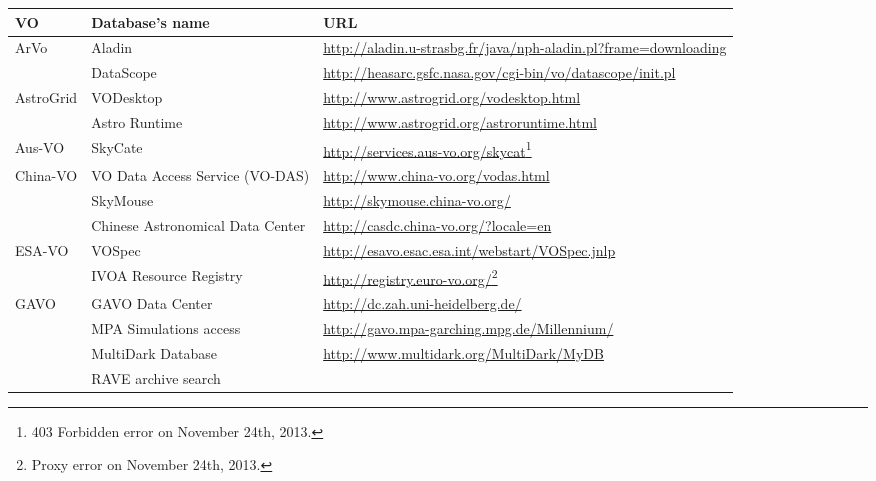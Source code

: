 \onecolumn
\begin{longtable}{|m{2cm}|m{4.5cm}|m{7.5cm}|}
    \hline
    \textbf{VO} & \textbf{Database's name} & \textbf{URL} \\
    \hline
    \multirow{2}{*}{ArVo} & Aladin
    & \url{http://aladin.u-strasbg.fr/java/nph-aladin.pl?frame=downloading} \\
    \cline{2-3}
     & DataScope
     & \url{http://heasarc.gsfc.nasa.gov/cgi-bin/vo/datascope/init.pl} \\
     \hline
    \multirow{2}{*}{AstroGrid} & VODesktop
    & \url{http://www.astrogrid.org/vodesktop.html}\\
    \cline{2-3}
     & Astro Runtime & \url{http://www.astrogrid.org/astroruntime.html} \\
     \hline
    Aus-VO & SkyCate
    & \url{http://services.aus-vo.org/skycat}\footnote{403 Forbidden error on 
                                                       November 24th, 2013.} \\ 
    \hline
    \multirow{3}{*}{China-VO} & VO Data Access Service (VO-DAS)
    & \url{http://www.china-vo.org/vodas.html} \\
    \cline{2-3}
     & SkyMouse & \url{http://skymouse.china-vo.org/} \\
     \cline{2-3}
     & Chinese Astronomical Data Center 
     & \url{http://casdc.china-vo.org/?locale=en} \\
     \hline
    \multirow{2}{*}{ESA-VO} & VOSpec
    & \url{http://esavo.esac.esa.int/webstart/VOSpec.jnlp} \\
     \cline{2-3}
     & IVOA Resource Registry
     & \url{http://registry.euro-vo.org/}\footnote{Proxy error on November 24th,
                                                   2013.} \\
     \hline
    \multirow{5}{*}{GAVO} & GAVO Data Center
    & \url{http://dc.zah.uni-heidelberg.de/} \\
    \cline{2-3}
     & MPA Simulations access
     & \url{http://gavo.mpa-garching.mpg.de/Millennium/} \\
     \cline{2-3}
     & MultiDark Database
     & \url{http://www.multidark.org/MultiDark/MyDB} \\
     \cline{2-3}
     & RAVE archive search

\end{longtable}
